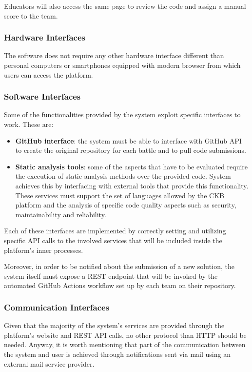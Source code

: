 Educators will also access the same page to review the code and assign a manual score to the team.

\subsubsection{Hardware Interfaces}
The software does not require any other hardware interface different than personal computers or smartphones equipped with modern browser from which users can access the platform.

\subsubsection{Software Interfaces}
Some of the functionalities provided by the system exploit specific interfaces to work. These are:
\begin{itemize}
    \item \textbf{GitHub interface}: the system must be able to interface with GitHub API to create the original repository for each battle and to pull code submissions.
    \item \textbf{Static analysis tools}: some of the aspects that have to be evaluated require the execution of static analysis methods over the provided code. System achieves this by interfacing with external tools that provide this functionality. These services must support the set of languages allowed by the CKB platform and the analysis of specific code quality aspects such as security, maintainability and reliability.
\end{itemize}
Each of these interfaces are implemented by correctly setting and utilizing specific API calls to the involved services that will be included inside the platform’s inner processes.

Moreover, in order to be notified about the submission of a new solution, the system itself must expose a REST endpoint that will be invoked by the automated GitHub Actions workflow set up by each team on their repository.

\newpage
\subsubsection{Communication Interfaces}
Given that the majority of the system's services are provided through the platform's website and REST API calls, no other protocol than HTTP should be needed. Anyway, it is worth mentioning that part of the communication between the system and user is achieved through notifications sent via mail using an external mail service provider.
\newpage

